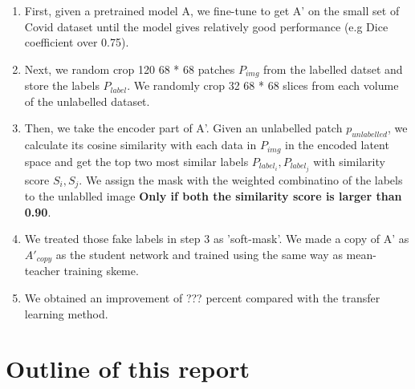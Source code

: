 { \begin{enumerate}
 	\item First, given a pretrained model A, we fine-tune to get A' on the small set of Covid dataset until the model gives relatively good performance (e.g Dice coefficient over 0.75).
 	\item Next, we random crop 120 68 * 68 patches $P_{img}$ from the labelled datset and store the labels $P_{label}$. We randomly crop 32 68 * 68 slices from each volume of the unlabelled dataset.
 	\item Then, we take the encoder part of A'. Given an unlabelled patch $p_{unlabelled}$, we calculate its cosine similarity with each data in $P_{img}$ in the encoded latent space and get the top two most similar labels $P_{label_{i}}, P_{label_{j}}$ with similarity score $S_{i}, S_{j}$. We assign the mask with the weighted combinatino of the labels to the unlablled image \textbf{Only if both the similarity score is larger than 0.90}.
 	\item We treated those fake labels in step 3 as 'soft-mask'. We made a copy of A' as $A'_{copy}$ as the student network and trained using the same way as mean-teacher training skeme.
 	\item We obtained an improvement of ??? percent compared with the transfer learning method. 
 	\end{enumerate}
 }
 
\newpage 

\section{Outline of this report}

